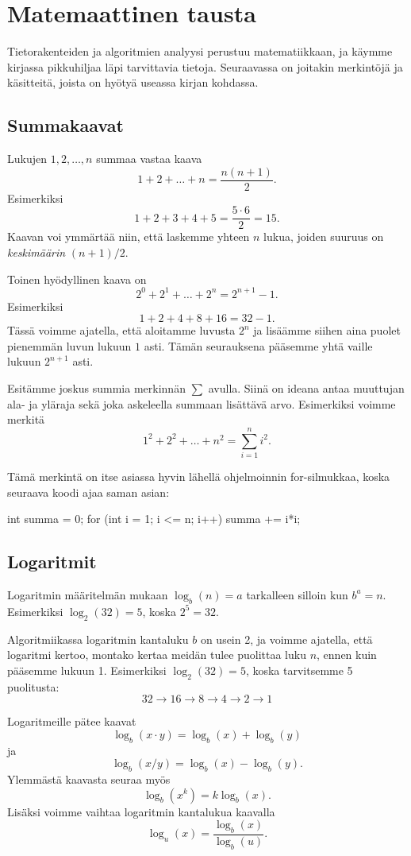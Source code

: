 \section{Matemaattinen tausta}

Tietorakenteiden ja algoritmien analyysi perustuu matematiikkaan,
ja käym\-me kirjassa pikkuhiljaa läpi tarvittavia tietoja.
Seuraavassa on joitakin merkintöjä ja käsitteitä, joista on hyötyä
useassa kirjan kohdassa.

\subsection{Summakaavat}

Lukujen $1,2,\dots,n$ summaa vastaa kaava
\[1+2+\dots+n = \frac{n(n+1)}{2}.\]
Esimerkiksi
\[1+2+3+4+5 = \frac{5 \cdot 6}{2}=15.\]
Kaavan voi ymmärtää niin, että laskemme yhteen $n$ lukua,
joiden suuruus on \emph{keskimäärin} $(n+1)/2$.

Toinen hyödyllinen kaava on
\[2^0+2^1+\dots+2^n = 2^{n+1}-1.\]
Esimerkiksi
\[1+2+4+8+16=32-1.\]
Tässä voimme ajatella, että aloitamme luvusta $2^n$
ja lisäämme siihen aina puolet pienemmän luvun lukuun $1$ asti.
Tämän seurauksena pääsemme yhtä vaille lukuun $2^{n+1}$ asti.

Esitämme joskus summia merkinnän $\sum$ avulla.
Siinä on ideana antaa muuttujan ala- ja yläraja sekä
joka askeleella summaan lisättävä arvo.
Esimerkiksi voimme merkitä
\[1^2 + 2^2 + \dots + n^2 = \sum_{i=1}^n i^2.\]

Tämä merkintä on itse asiassa hyvin lähellä ohjelmoinnin
for-silmukkaa, koska seuraava koodi ajaa saman asian:

\begin{code}
int summa = 0;
for (int i = 1; i <= n; i++) {
    summa += i*i;
}
\end{code}

\subsection{Logaritmit}

Logaritmin määritelmän mukaan $\log_b(n)=a$
tarkalleen silloin kun $b^a=n$.
Esimerkiksi $\log_2(32)=5$, koska $2^5=32$.

Algoritmiikassa logaritmin kantaluku $b$ on usein 2,
ja voimme ajatella, että logaritmi kertoo, montako kertaa
meidän tulee puolittaa luku $n$, ennen kuin pääsemme lukuun 1.
Esimerkiksi $\log_2(32)=5$, koska tarvitsemme 5 puolitusta:
\[32 \rightarrow 16 \rightarrow 8 \rightarrow 4 \rightarrow 2 \rightarrow 1\]

Logaritmeille pätee kaavat
\[\log_b(x \cdot y) = \log_b(x)+\log_b(y)\]
ja
\[\log_b(x / y) = \log_b(x)-\log_b(y).\]
Ylemmästä kaavasta seuraa myös
\[\log_b(x^k) = k \log_b(x).\]
Lisäksi voimme vaihtaa logaritmin kantalukua kaavalla
\[\log_u(x) = \frac{\log_b(x)}{\log_b(u)}.\]